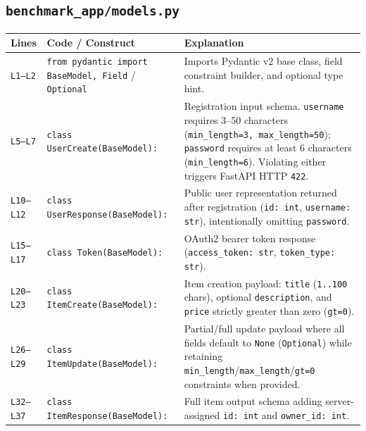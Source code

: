 \documentclass[11pt,a4paper]{article}
\begin{document}
\subsection{\texttt{benchmark\_app/models.py}}
\begin{longtable}{L{1.4cm} L{5.2cm} L{9.0cm}}
\toprule
\textbf{Lines} & \textbf{Code / Construct} & \textbf{Explanation} \\
\midrule
\endhead
\texttt{L1--L2} & \texttt{from pydantic import BaseModel, Field} / \texttt{Optional} & Imports Pydantic v2 base class, field constraint builder, and optional type hint. \\
\texttt{L5--L7} & \texttt{class UserCreate(BaseModel):} & Registration input schema. \texttt{username} requires 3--50 characters (\texttt{min\_length=3, max\_length=50}); \texttt{password} requires at least 6 characters (\texttt{min\_length=6}). Violating either triggers FastAPI HTTP \texttt{422}. \\
\texttt{L10--L12} & \texttt{class UserResponse(BaseModel):} & Public user representation returned after registration (\texttt{id: int}, \texttt{username: str}), intentionally omitting \texttt{password}. \\
\texttt{L15--L17} & \texttt{class Token(BaseModel):} & OAuth2 bearer token response (\texttt{access\_token: str}, \texttt{token\_type: str}). \\
\texttt{L20--L23} & \texttt{class ItemCreate(BaseModel):} & Item creation payload: \texttt{title} (\texttt{1..100} chars), optional \texttt{description}, and \texttt{price} strictly greater than zero (\texttt{gt=0}). \\
\texttt{L26--L29} & \texttt{class ItemUpdate(BaseModel):} & Partial/full update payload where all fields default to \texttt{None} (\texttt{Optional}) while retaining \texttt{min\_length}/\texttt{max\_length}/\texttt{gt=0} constraints when provided. \\
\texttt{L32--L37} & \texttt{class ItemResponse(BaseModel):} & Full item output schema adding server-assigned \texttt{id: int} and \texttt{owner\_id: int}. \\
\bottomrule
\end{longtable}

\end{document}
